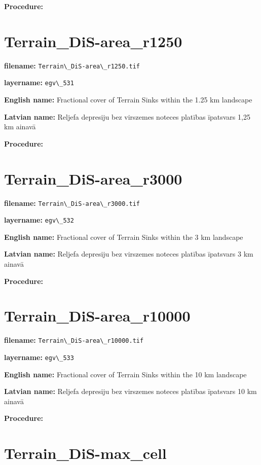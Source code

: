 \documentclass[
]{book}
\newcommand{\passthrough}[1]{#1}
\begin{document}
\textbf{Procedure:}

\section{Terrain\_DiS-area\_r1250}\label{ch06.531}

\textbf{filename:} \passthrough{\lstinline!Terrain\_DiS-area\_r1250.tif!}

\textbf{layername:} \passthrough{\lstinline!egv\_531!}

\textbf{English name:} Fractional cover of Terrain Sinks within the 1.25 km landscape

\textbf{Latvian name:} Reljefa depresiju bez virszemes noteces platības īpatsvars 1,25 km ainavā

\textbf{Procedure:}

\section{Terrain\_DiS-area\_r3000}\label{ch06.532}

\textbf{filename:} \passthrough{\lstinline!Terrain\_DiS-area\_r3000.tif!}

\textbf{layername:} \passthrough{\lstinline!egv\_532!}

\textbf{English name:} Fractional cover of Terrain Sinks within the 3 km landscape

\textbf{Latvian name:} Reljefa depresiju bez virszemes noteces platības īpatsvars 3 km ainavā

\textbf{Procedure:}

\section{Terrain\_DiS-area\_r10000}\label{ch06.533}

\textbf{filename:} \passthrough{\lstinline!Terrain\_DiS-area\_r10000.tif!}

\textbf{layername:} \passthrough{\lstinline!egv\_533!}

\textbf{English name:} Fractional cover of Terrain Sinks within the 10 km landscape

\textbf{Latvian name:} Reljefa depresiju bez virszemes noteces platības īpatsvars 10 km ainavā

\textbf{Procedure:}

\section{Terrain\_DiS-max\_cell}\label{ch06.534}
\end{document}
